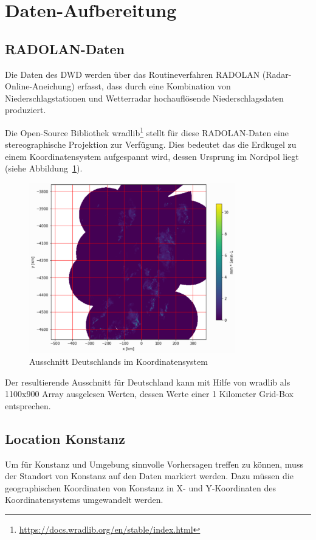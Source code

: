 \section{Daten-Aufbereitung}

\subsection{RADOLAN-Daten}
Die Daten des DWD werden über das Routineverfahren RADOLAN (Radar-Online-Aneichung) erfasst, dass durch eine Kombination von Niederschlagstationen und Wetterradar hochauflösende Niederschlagsdaten produziert. 

Die Open-Source Bibliothek wradlib\footnote{\url{https://docs.wradlib.org/en/stable/index.html}} stellt für diese RADOLAN-Daten eine stereographische Projektion zur Verfügung. Dies bedeutet das die Erdkugel zu einem Koordinatensystem aufgespannt wird, dessen Ursprung im Nordpol liegt (siehe Abbildung~\ref{rz}).

\begin{figure}[H]
	\centering
	\includegraphics[width=0.8\textwidth]{pics/RZ_product}
	\caption{Ausschnitt Deutschlands im Koordinatensystem}
	\label{rz}
\end{figure}

Der resultierende Ausschnitt für Deutschland kann mit Hilfe von wradlib als 1100x900 Array ausgelesen Werten, dessen Werte einer 1 Kilometer Grid-Box entsprechen.

\subsection{Location Konstanz}
\label{locKN}
Um für Konstanz und Umgebung sinnvolle Vorhersagen treffen zu können, muss der Standort von Konstanz auf den Daten markiert werden. Dazu müssen die geographischen Koordinaten von Konstanz in X- und Y-Koordinaten des Koordinatensystems umgewandelt werden.

